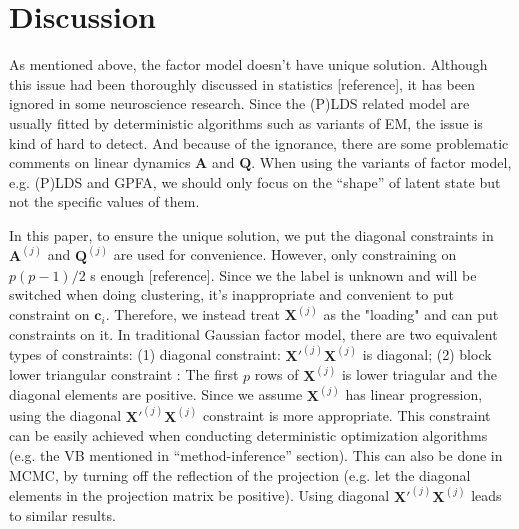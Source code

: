 \documentclass{article}
\begin{document}
%	
%		
%		
	
	
	\section{Discussion}
	
	As mentioned above, the factor model doesn’t have unique solution. Although this issue had been thoroughly discussed in statistics [reference], it has been ignored in some neuroscience research. Since the (P)LDS related model are usually fitted by deterministic algorithms such as variants of EM, the issue is kind of hard to detect. And because of the ignorance, there are some problematic comments on linear dynamics $\bm{A}$ and $\bm{Q}$. When using the variants of factor model, e.g. (P)LDS and GPFA, we should only focus on the “shape” of latent state but not the specific values of them.
	
	In this paper, to ensure the unique solution, we put the diagonal constraints in $\bm{A}^{(j)}$ and $\bm{Q}^{(j)}$ are used for convenience. However, only constraining on $p(p-1)/2$ s enough [reference]. Since we the label is unknown and will be switched when doing clustering, it’s inappropriate and convenient to put constraint on $\bm{c}_i$. Therefore, we instead treat $\bm{X}^{(j)}$ as the "loading" and can put constraints on it. In traditional Gaussian factor model, there are two equivalent types of constraints: (1) diagonal constraint: $\bm{X}'^{(j)}\bm{X}^{(j)}$ is diagonal; (2) block lower triangular constraint \citep{Fokoue2003}: The first $p$ rows of $\bm{X}^{(j)}$ is lower triagular and the diagonal elements are positive. Since we assume $\bm{X}^{(j)}$ has linear progression, using the diagonal $\bm{X}'^{(j)}\bm{X}^{(j)}$ constraint is more appropriate. This constraint can be easily achieved when conducting deterministic optimization algorithms (e.g. the VB mentioned in “method-inference” section). This can also be done in MCMC, by turning off the reflection of the projection (e.g. let the diagonal elements in the projection matrix be positive). Using diagonal $\bm{X}'^{(j)}\bm{X}^{(j)}$  leads to similar results.
	
\end{document}
